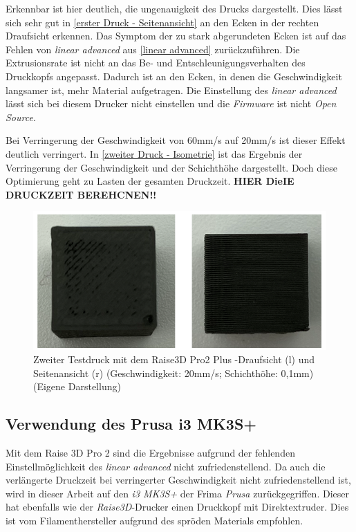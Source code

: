 Erkennbar ist hier deutlich, die ungenauigkeit des Drucks dargestellt. Dies lässt sich sehr gut in \autoref{erster Druck - Seitenansicht} an den Ecken in der rechten Draufsicht erkennen. Das Symptom der zu stark abgerundeten Ecken ist auf das Fehlen von \textit{linear advanced} aus \autoref{linear advanced} zurückzuführen. Die Extrusionsrate ist nicht an das Be- und Entschleunigungsverhalten des Druckkopfs angepasst. Dadurch ist an den Ecken, in denen die Geschwindigkeit langsamer ist, mehr Material aufgetragen. Die Einstellung des \textit{linear advanced} lässt sich bei diesem Drucker nicht einstellen und die \textit{Firmware} ist nicht \textit{Open Source}.

Bei Verringerung der Geschwindigkeit von 60mm/s auf 20mm/s ist dieser Effekt deutlich verringert. In \autoref{zweiter Druck - Isometrie} ist das Ergebnis der Verringerung der Geschwindigkeit und der Schichthöhe dargestellt. Doch diese Optimierung geht zu Lasten der gesamten Druckzeit. \textbf{HIER DieIE DRUCKZEIT BEREHCNEN!!}

\begin{figure}[h]
	\centering
	\includegraphics[width=\linewidth]{bilder/2. Testdruck auf Raise Pro 3D Seitenansicht - Draufsicht.png}
        \caption[Zweiter Testdruck mit dem Raise3D Pro2 Plus - Isometrische Ansicht] {Zweiter Testdruck mit dem Raise3D Pro2 Plus -Draufsicht (l) und Seitenansicht (r) (Geschwindigkeit: 20mm/s; Schichthöhe: 0,1mm) (Eigene Darstellung)}
	\label{zweiter Druck - Isometrie}
\end{figure}

\subsection{Verwendung des Prusa i3 MK3S+}
\label{Drucker}

Mit dem Raise 3D Pro 2 sind die Ergebnisse aufgrund der fehlenden Einstellmöglichkeit des \textit{linear advanced} nicht zufriedenstellend. Da auch die verlängerte Druckzeit bei verringerter Geschwindigkeit nicht zufriedenstellend ist, wird in dieser Arbeit auf den \textit{i3 MK3S+} der Frima \textit{Prusa} zurückgegriffen. Dieser hat ebenfalls wie der \textit{Raise3D}-Drucker einen Druckkopf mit Direktextruder. Dies ist vom Filamenthersteller aufgrund des spröden Materials empfohlen.

